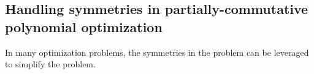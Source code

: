 \subsection{Handling symmetries in partially-commutative polynomial optimization}
In many optimization problems, the symmetries in the problem can be leveraged to simplify the problem. 
